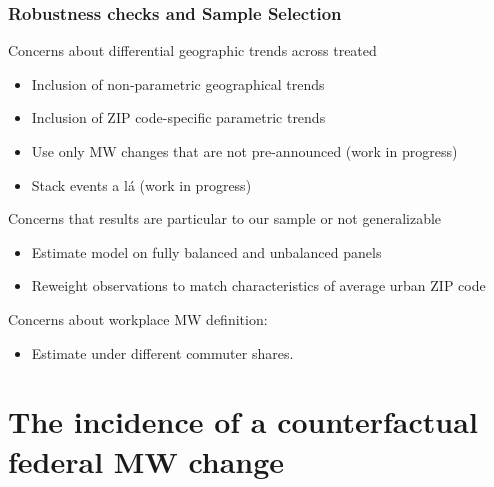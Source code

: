 \documentclass[aspectratio=169, t]{beamer}
\begin{document}
\begin{frame}[label = robus_sample]
    \frametitle{Robustness checks and Sample Selection}

    Concerns about differential geographic trends across treated
    \begin{itemize}
        \item Inclusion of non-parametric geographical trends
        \item Inclusion of ZIP code-specific parametric trends
        \item Use only MW changes that are not pre-announced (work in progress)
        \item Stack events a lá \cite{CegnizEtAl2019} (work in progress)
    \end{itemize}
    \hyperlink{robustness_geo}{}

    \vspace{3mm}
    Concerns that results are particular to our sample or not generalizable
    \begin{itemize}
        \item Estimate model on fully balanced and unbalanced panels
        \item Reweight observations to match characteristics of average urban ZIP code
    \end{itemize}
    \hyperlink{robustness_geo}{}
    
    \vspace{3mm}
    Concerns about workplace MW definition:
    \begin{itemize}
        \item Estimate under different commuter shares.
    \end{itemize}
    \hyperlink{robustness_exp_mw}{}
\end{frame}

\section{The incidence of a counterfactual federal MW change}
\end{document}
